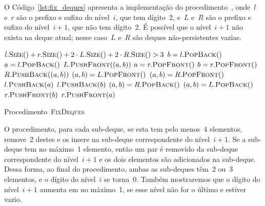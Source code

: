 \documentclass[../../main.tex]{subfiles}
\begin{document}
O Código~\ref{lst:fix_deques} apresenta a implementação do procedimento~, onde~$l$ e~$r$ são o prefixo e sufixo do nível~$i$, que tem dígito~2, e~$L$ e~$R$ são o prefixo e sufixo do nível~$i+1$, que não tem dígito~2. É possível que o nível~$i+1$ não exista na deque atual; nesse caso~$L$ e~$R$ são deques não-persistentes vazias.

\begin{algorithm}
\begin{algorithmic}[1]

\Require $l.\Call{Size}{\null} + r.\Call{Size}{\null} + 2\cdot L.\Call{Size}{\null} + 2\cdot R.\Call{Size}{\null} > 3$
     \label{line:fd:if5}
        \State $b = {l}.\Call{PopBack}{\null}$
        \State $a = {l}.\Call{PopBack}{\null}$
        \State ${L}.\Call{PushFront}{(a, b)}$
    \EndIf
     \label{line:fd:if6}
        \State $a = {r}.\Call{PopFront}{\null}$
        \State $b = {r}.\Call{PopFront}{\null}$
        \State ${R}.\Call{PushBack}{(a, b)}$
    \EndIf
     \label{line:fd:if3}
         \label{line:fd:if1}
            \State $(a, b) = {L}.\Call{PopFront}{\null}$
        \Else
            \State $(a, b) = {R}.\Call{PopFront}{\null}$
        \EndIf
        \State ${l}.\Call{PushBack}{a}$
        \State ${l}.\Call{PushBack}{b}$
    \EndIf
     \label{line:fd:if4}
         \label{line:fd:if2}
            \State $(a, b) = {R}.\Call{PopBack}{\null}$
        \Else
            \State $(a, b) = {L}.\Call{PopBack}{\null}$
        \EndIf
        \State ${r}.\Call{PushFront}{b}$
        \State ${r}.\Call{PushFront}{a}$
    \EndIf
\EndProcedure

\end{algorithmic}
\caption{Procedimento~\textsc{FixDeques}} \label{lst:fix_deques}
\end{algorithm}

O procedimento, para cada sub-deque, se esta tem pelo menos~4 elementos, remove~2 destes e os insere na sub-deque correspondente do nível~$i+1$. Se a sub-deque tem no máximo~1 elemento, então um par é removido da sub-deque correspondente do nível~$i+1$ e os dois elementos são adicionados na sub-deque. Dessa forma, ao final do procedimento, ambas as sub-deques têm~2 ou~3 elementos, e o dígito do nível~$i$ se torna~0. Também mostraremos que o dígito do nível~$i+1$ aumenta em no máximo~1, se esse nível não for o último e estiver vazio.
\end{document}
